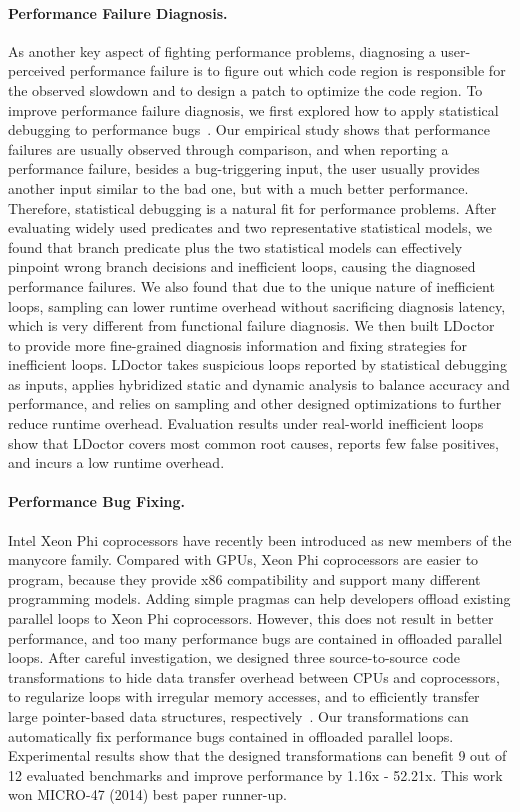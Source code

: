 \documentclass[10pt]{article}
\begin{document}
\paragraph{Performance Failure Diagnosis.}
As another key aspect of fighting performance problems,
diagnosing a user-perceived performance failure is to figure out which code 
region is responsible for the observed slowdown and 
to design a patch to optimize the code region.
To improve performance failure diagnosis, 
we first explored how to 
apply statistical debugging to performance bugs~\cite{Song14OOPSLA}. 
Our empirical study shows that performance failures are usually observed through comparison,
and when reporting a performance failure, besides a bug-triggering input, 
the user usually provides another input similar to the bad one, 
but with a much better performance.
Therefore, statistical debugging is a natural fit for performance problems. 
After evaluating widely used predicates and 
two representative statistical models, 
we found that branch predicate plus the two statistical models can effectively 
pinpoint wrong branch decisions and inefficient loops, 
causing the diagnosed performance failures. 
We also found that
due to the unique nature of inefficient loops, 
sampling can lower runtime overhead without sacrificing diagnosis latency, 
which is very different from functional failure diagnosis.
We then built LDoctor~\cite{Song17ICSE} to provide more 
fine-grained diagnosis information and fixing strategies for inefficient loops. 
LDoctor takes suspicious loops reported by 
statistical debugging as inputs, 
applies hybridized static and dynamic analysis to 
balance accuracy and performance, 
and relies on sampling and other designed optimizations 
to further reduce runtime overhead. 
Evaluation results under real-world inefficient loops 
show that LDoctor covers most common root causes, 
reports few false positives, and incurs a low runtime overhead. 

\vspace{-.1in}
\paragraph{Performance Bug Fixing.}
Intel Xeon Phi coprocessors have recently been introduced 
as new members of the manycore family.
Compared with GPUs, Xeon Phi coprocessors are easier to program,
because they provide x86 compatibility and support many different programming models.
Adding simple pragmas can help developers offload existing parallel loops 
to Xeon Phi coprocessors. 
However, this does not result in better performance, 
and too many performance bugs are contained in 
offloaded parallel loops. 
After careful investigation, we designed three source-to-source code transformations to 
hide data transfer overhead between CPUs and coprocessors, 
to regularize loops with irregular memory accesses, 
and to efficiently transfer large pointer-based data structures, respectively~\cite{Song14MICRO}.
Our transformations can automatically fix performance bugs contained in offloaded parallel loops. 
Experimental results show that the designed transformations can benefit 9 
out of 12 evaluated benchmarks and improve performance by 1.16x - 52.21x. 
This work won MICRO-47 (2014) best paper runner-up.
\end{document}
